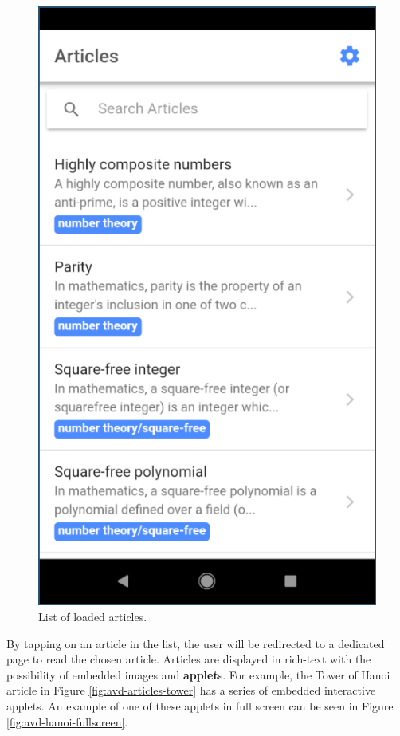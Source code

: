 \documentclass[12pt]{report}
\begin{document}
\begin{figure}
    \centering
    \includegraphics[scale=0.5]{images/avd-articles-loaded.png}
    \caption{List of loaded articles.}
    \label{fig:avd-articles-loaded}
\end{figure}

By tapping on an article in the list, the user will be redirected to a dedicated
page to read the chosen article. Articles are displayed in rich-text with the
possibility of embedded images and \textbf{applet}s. For example, the Tower of
Hanoi article in Figure \ref{fig:avd-articles-tower} has a series of embedded
interactive applets. An example of one of these applets in full screen can be
seen in Figure \ref{fig:avd-hanoi-fullscreen}.
\end{document}
